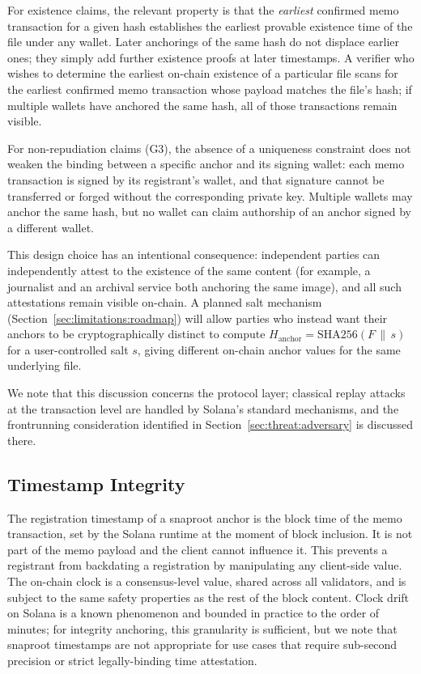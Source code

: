 \documentclass[11pt,a4paper]{article}
\begin{document}
For existence claims, the relevant property is that the
\emph{earliest} confirmed memo transaction for a given hash establishes
the earliest provable existence time of the file under any wallet.
Later anchorings of the same hash do not displace earlier ones; they
simply add further existence proofs at later timestamps. A verifier
who wishes to determine the earliest on-chain existence of a particular
file scans for the earliest confirmed memo transaction whose payload
matches the file's hash; if multiple wallets have anchored the same
hash, all of those transactions remain visible.

For non-repudiation claims (G3), the absence of a uniqueness constraint
does not weaken the binding between a specific anchor and its signing
wallet: each memo transaction is signed by its registrant's wallet,
and that signature cannot be transferred or forged without the
corresponding private key. Multiple wallets may anchor the same hash,
but no wallet can claim authorship of an anchor signed by a different
wallet.

This design choice has an intentional consequence: independent parties
can independently attest to the existence of the same content (for
example, a journalist and an archival service both anchoring the same
image), and all such attestations remain visible on-chain. A planned
salt mechanism (Section~\ref{sec:limitations:roadmap}) will allow
parties who instead want their anchors to be cryptographically distinct
to compute $H_{\text{anchor}} = \mathrm{SHA256}(F\,\|\,s)$ for a
user-controlled salt $s$, giving different on-chain anchor values for
the same underlying file.

We note that this discussion concerns the protocol layer; classical
replay attacks at the transaction level are handled by Solana's
standard mechanisms, and the frontrunning consideration identified in
Section~\ref{sec:threat:adversary} is discussed there.

\subsection{Timestamp Integrity}
\label{sec:security:timestamp}

The registration timestamp of a snaproot anchor is the block time of
the memo transaction, set by the Solana runtime at the moment of block
inclusion. It is not part of the memo payload and the client cannot
influence it. This prevents a registrant from backdating a registration
by manipulating any client-side value. The on-chain clock is a
consensus-level value, shared across all validators, and is
subject to the same safety properties as the rest of the block content.
Clock drift on Solana is a known phenomenon and bounded in practice
to the order of minutes; for integrity anchoring, this granularity is
sufficient, but we note that snaproot timestamps are not appropriate
for use cases that require sub-second precision or strict
legally-binding time attestation.
\end{document}
